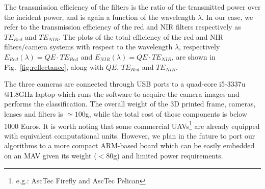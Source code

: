 \documentclass[letterpaper, 10pt, conference]{ieeeconf}      %
\begin{document}
The transmission efficiency of the filters is the ratio of the transmitted power over the incident power, and is again a function of the wavelength $\lambda$. In our case, we refer to the transmission efficiency of the red and NIR filters respectively as ${TE}_{Red}$ and  $TE_{NIR}$.
The plots of the total efficiency of the red and NIR filters/camera systems with respect to the wavelength $\lambda$, respectively $E_{Red}(\lambda)=QE\cdot TE_{Red}$ and $E_{NIR}(\lambda)=QE \cdot TE_{NIR}$, are shown in Fig.~\ref{fig:reflectance}, along with $QE$, $TE_{Red}$ and  $TE_{NIR}$.




The three cameras are connected through USB ports to a quad-core i5-3337u @1.8GHz laptop which runs the software to acquire the camera images and performs the classification.
The overall weight of the 3D printed frame, cameras, lenses and filters is $\simeq100$g, while the total cost of those components is below 1000 Euros.
It is worth noting that some commercial UAVs\footnote{\vspace{-0mm}e.g.: AscTec Firefly and AscTec Pelican} are already equipped with equivalent computational units.
However, we plan in the future to port our algorithms to a more compact ARM-based board which can be easily embedded on an MAV given its weight ($<80$g) and limited power requirements.

   
   
\end{document}
